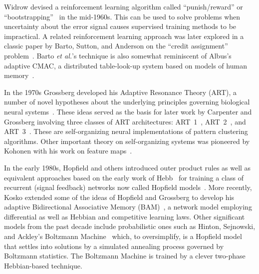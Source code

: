 \documentclass[10pt,twocolumn]{article}
\begin{document}
Widrow devised a reinforcement learning algorithm called ``punish/reward'' or
``bootstrapping''~\cite{boot66,boot73} in the mid-1960s. This can be used to
solve problems when uncertainty about the error signal causes supervised
training methods to be impractical. A related reinforcement learning approach
was later explored in a classic paper by Barto, Sutton, and Anderson on the
``credit assignment'' problem~\cite{barto}. Barto \textit{et al.}'s technique is
also somewhat reminiscent of Albus's adaptive CMAC, a distributed
table-look-up system based on models of human memory~\cite{albus,miller}.

In the 1970s Grossberg developed his Adaptive Resonance Theory (ART), a number
of novel hypotheses about the underlying principles governing biological neural
systems~\cite{gross76b}. These ideas served as the basis for later work by
Carpenter and Grossberg involving three classes of ART architectures:
ART~1~\cite{art1}, ART~2~\cite{art2}, and ART~3~\cite{art3}. These are
self-organizing neural implementations of pattern clustering algorithms. Other
important theory on self-organizing systems was pioneered by Kohonen with his
work on feature maps~\cite{koh82,koh88}.

In the early 1980s, Hopfield and others introduced outer product rules as well
as equivalent approaches based on the early work of Hebb~\cite{hebb} for
training a class of recurrent (signal feedback) networks now called Hopfield
models~\cite{hop82,hop84}. More recently, Kosko extended some of the ideas of
Hopfield and Grossberg to develop his adaptive Bidirectional Associative Memory
(BAM)~\cite{kosko}, a network model employing differential as well as Hebbian
and competitive learning laws. Other significant models from the past decade
include probabilistic ones such as Hinton, Sejnowski, and Ackley's Boltzmann
Machine~\cite{boltz1,boltz2} which, to oversimplify, is a Hopfield model that
settles into solutions by a simulated annealing process governed by Boltzmann
statistics. The Boltzmann Machine is trained by a clever two-phase
Hebbian-based technique.
\end{document}
